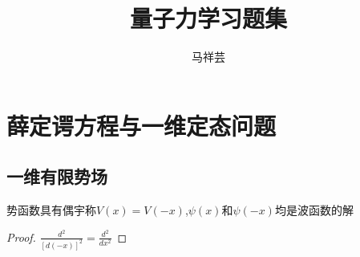 



\begin{comment}

\usepackage[UTF8, heading = false, scheme = plain]{ctex}    %
\usepackage{geometry}					 %
\usepackage{indentfirst}					 %
\usepackage{graphicx}					 %
\usepackage{hyperref}					 %
\usepackage{multirow}					 %
\usepackage{xcolor} 					 %
\usepackage{listings}					 %
\usepackage{verbatim}					 %



\geometry{a4paper,left=5em,right=5em,bottom=5em,top=5em}    %
\setlength{\parindent}{2em}    %
\hypersetup{hidelinks,colorlinks=true,linkcolor=black,urlcolor=blue}   %
\newtheorem{thm}{定理}[section]     %
center environment %
\textbf \emph %
thm environment	%
$equation$ (inline) or equation environment or package amsmah %
itemize environment or enumerate environment %

\end{comment}



\title{量子力学习题集}
\author{马祥芸}


    \maketitle
    \tableofcontents
    \newpage

    \section{薛定谔方程与一维定态问题}
        \subsection{一维有限势场}
        \begin{thm}\label{1.1}                                                %
            势函数具有偶宇称$V(x)=V(-x)$,$\psi(x)$和$\psi(-x)$均是波函数的解
            
            \begin{proof}
                
                $\frac{d^2}{[d(-x)]^2}=\frac{d^2}{dx^2}$ 
                
            \end{proof}
        
        \end{thm}
    

